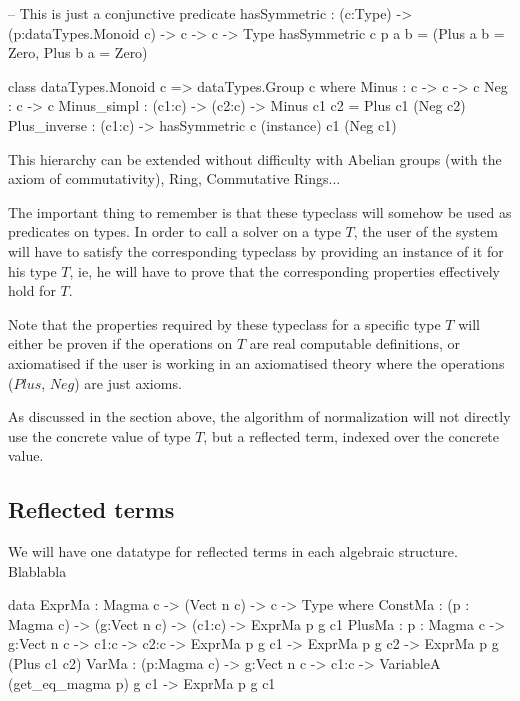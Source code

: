 \documentclass{sigplanconf}
\begin{document}
\begin{code}[caption=Group, captionpos=b, label=lst1:haskell2]   
-- This is just a conjunctive predicate
hasSymmetric : (c:Type) -> (p:dataTypes.Monoid c) 
                -> c -> c -> Type
hasSymmetric c p a b = 
         (Plus a b = Zero, Plus b a = Zero)    
  
class dataTypes.Monoid c => dataTypes.Group c where
	Minus : c -> c -> c
	Neg : c -> c
	Minus_simpl : (c1:c) -> (c2:c) -> 
	             Minus c1 c2 = Plus c1 (Neg c2) 
	Plus_inverse : (c1:c) -> 
	             hasSymmetric c (instance) c1 (Neg c1)
\end{code}	

This hierarchy can be extended without difficulty with Abelian groups (with the axiom of commutativity), Ring, Commutative Rings...

The important thing to remember is that these typeclass will somehow be used as predicates on types. In order to call a solver on a type $T$, the user of the system will have to satisfy the corresponding typeclass by providing an instance of it for his type $T$, ie, he will have to prove that the corresponding properties effectively hold for $T$.

Note that the properties required by these typeclass for a specific type $T$ will either be proven if the operations on $T$ are real computable definitions, or axiomatised if the user is working in an axiomatised theory where the operations ($Plus$, $Neg$) are just axioms.

As discussed in the section above, the algorithm of normalization will not directly use the concrete value of type $T$, but a reflected term, indexed over the concrete value.


	\subsection {Reflected terms}

We will have one datatype for reflected terms in each algebraic structure. \\
Blablabla

\begin{code}[caption=Reflected terms in a Magma, captionpos=b, label=lst1:haskell2]  
data ExprMa : Magma c -> (Vect n c) -> c -> 
              Type where
    ConstMa : (p : Magma c) -> (g:Vect n c) 
               -> (c1:c)  -> ExprMa p g c1 
    PlusMa : {p : Magma c} -> {g:Vect n c}
               -> {c1:c} -> {c2:c} 
               -> ExprMa p g c1 -> ExprMa p g c2 
               -> ExprMa p g (Plus c1 c2) 
    VarMa : (p:Magma c) -> {g:Vect n c}
               -> {c1:c} 
               -> VariableA (get_eq_magma p) g c1
               -> ExprMa p g c1
\end{code}	
\end{document}
